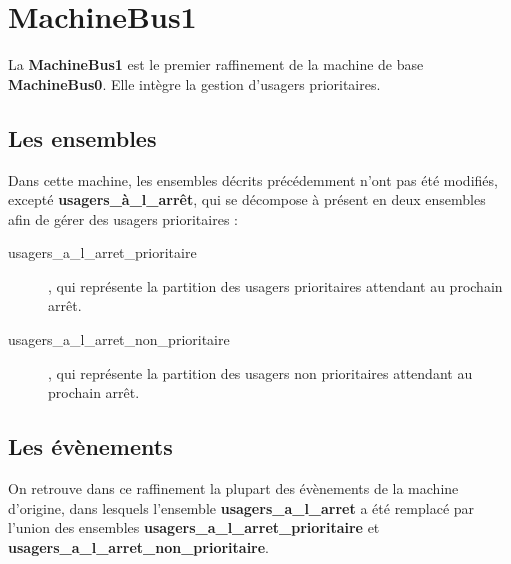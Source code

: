 \documentclass[a4paper,titlepage]{report}
\begin{document}
\section{MachineBus1}
	La \textbf{MachineBus1} est le premier raffinement de la machine de base \textbf{MachineBus0}. Elle intègre la gestion d'usagers prioritaires.\\
		
	\subsection{Les ensembles}
		Dans cette machine, les ensembles décrits précédemment n'ont pas été modifiés, excepté \textbf{usagers\_à\_l\_arrêt}, qui se décompose à présent en deux ensembles afin de gérer des usagers prioritaires :
		 	
		\begin{description}
			\item[usagers\_a\_l\_arret\_prioritaire], qui représente la partition des usagers prioritaires attendant au prochain arrêt.
			\item[usagers\_a\_l\_arret\_non\_prioritaire], qui représente la partition des usagers non prioritaires attendant au prochain arrêt.\\
		\end{description}
				
	\subsection{Les évènements}
		On retrouve dans ce raffinement la plupart des évènements de la machine d'origine, dans lesquels l'ensemble \textbf{usagers\_a\_l\_arret} a été remplacé par l'union des ensembles \textbf{usagers\_a\_l\_arret\_prioritaire} et \textbf{usagers\_a\_l\_arret\_non\_prioritaire}.\\
		
\end{document}
